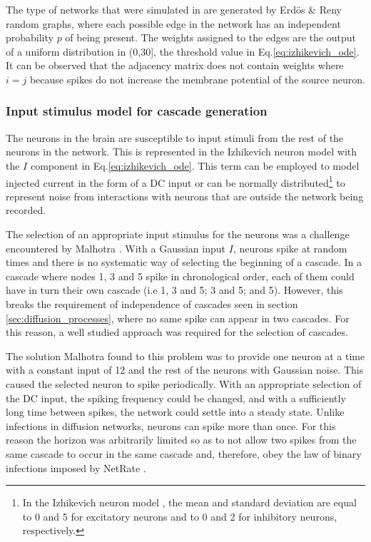 \documentclass[11pt]{article}
\begin{document}
The type of networks that were simulated in \cite{alexandru2018estimating} are generated by Erdös \& Reny random graphs, where each possible edge in the network has an independent probability $p$ of being present. The weights assigned to the edges are the output of a uniform distribution in (0,30], the threshold value in Eq.\ref{eq:izhikevich_ode}. It can be observed that the adjacency matrix does not contain weights where $i=j$ because spikes do not increase the membrane potential of the source neuron.


\subsubsection{Input stimulus model for cascade generation}

The neurons in the brain are susceptible to input stimuli from the rest of the neurons in the network. This is represented in the Izhikevich neuron model with the $I$ component in Eq.\ref{eq:izhikevich_ode}. This term can be employed to model injected current in the form of a DC input or can be normally distributed\footnote{In the Izhikevich neuron model \cite{izhikevich2003simple}, the mean and standard deviation are equal to 0 and 5 for excitatory neurons and to 0 and 2 for inhibitory neurons, respectively.} to represent noise from interactions with neurons that are outside the network being recorded.

The selection of an appropriate input stimulus for the neurons was a challenge encountered by Malhotra \cite{alexandru2018estimating}. With a Gaussian input $I$, neurons spike at random times and there is no systematic way of selecting the beginning of a cascade. In a cascade where nodes 1, 3 and 5 spike in chronological order, each of them could have in turn their own cascade (i.e 1, 3 and 5; 3 and 5; and 5). However, this breaks the requirement of independence of cascades seen in section \ref{sec:diffusion_processes}, where no same spike can appear in two cascades. For this reason, a well studied approach was required for the selection of cascades. 

The solution Malhotra found to this problem was to provide one neuron at a time with a constant input of 12 and the rest of the neurons with Gaussian noise. This caused the selected neuron to spike periodically. With an appropriate selection of the DC input, the spiking frequency could be changed, and with a sufficiently long time between spikes, the network could settle into a steady state. Unlike infections in diffusion networks, neurons can spike more than once. For this reason the horizon was arbitrarily limited so as to not allow two spikes from the same cascade to occur in the same cascade and, therefore, obey the law of binary infections imposed by NetRate \cite{alexandru2018estimating}.
\end{document}
